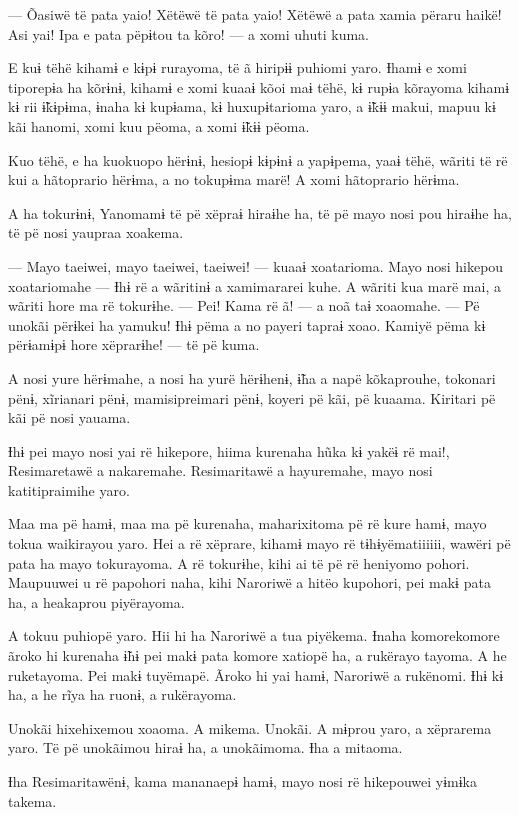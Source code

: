 --- Õasiwë të pata yaio! Xëtëwë të pata yaio! Xëtëwë a pata xamia përaru
haikë! Asi yai! Ipa e pata pëpɨtou ta kõro! --- a xomi uhuti kuma. 

E kuɨ tëhë kihamɨ e kɨpɨ rurayoma, të ã hiripɨɨ puhiomi yaro. Ɨhamɨ e
xomi tiporepɨa ha kõrɨnɨ, kihamɨ e xomi kuaaɨ kõoi maɨ tëhë, kɨ rupɨa
kõrayoma kihamɨ kɨ rii ɨ̃kɨpɨma, ɨnaha kɨ kupɨama, kɨ huxupɨtarioma yaro,
a ɨ̃kɨɨ makui, mapuu kɨ kãi hanomi, xomi kuu pëoma, a xomi ɨ̃kɨɨ pëoma. 

Kuo tëhë, e ha kuokuopo hërɨnɨ, hesiopɨ kɨpɨnɨ a yapɨpema, yaaɨ tëhë,
wãriti të rë kui a hãtoprario hërɨma, a no tokupɨma marë! A xomi
hãtoprario hërɨma. 

A ha tokurɨnɨ, Yanomamɨ të pë xëpraɨ hiraɨhe ha, të pë mayo nosi pou
hiraɨhe ha, të pë nosi yaupraa xoakema. 

--- Mayo taeiwei, mayo taeiwei, taeiwei! --- kuaaɨ xoatarioma. Mayo nosi
hikepou xoatariomahe --- Ɨhɨ rë a wãritinɨ a xamimararei kuhe. A wãriti
kua marë mai, a wãriti hore ma rë tokurɨhe. --- Pei! Kama rë ã! --- a
noã taɨ xoaomahe. --- Pë unokãi përɨkei ha yamuku! Ɨhɨ pëma a no payeri
tapraɨ xoao. Kamiyë pëma kɨ përɨamɨpɨ hore xëprarɨhe! --- të pë kuma. 

A nosi yure hërɨmahe, a nosi ha yurë hërɨhenɨ, ɨ̃ha a napë kõkaprouhe,
tokonari pënɨ, xĩrianari pënɨ, mamisipreimari pënɨ, koyeri pë kãi, pë
kuaama. Kiritari pë kãi pë nosi yauama. 

Ɨhɨ pei mayo nosi yai rë hikepore, hiima kurenaha hũka kɨ yakëɨ rë mai!,
Resimaretawë a nakaremahe. Resimaritawë a hayuremahe, mayo nosi
katitipraimihe yaro. 

Maa ma pë hamɨ, maa ma pë kurenaha, maharixitoma pë rë kure hamɨ, mayo
tokua waikirayou yaro. Hei a rë xëprare, kihamɨ mayo rë tɨhɨyëmatiiiiii,
wawëri pë pata ha mayo tokurayoma. A rë tokurɨhe, kihi ai të pë rë
heniyomo pohori. Maupuuwei u rë papohori naha, kihi Naroriwë a hitëo
kupohori, pei makɨ pata ha, a heakaprou piyërayoma. 

A tokuu puhiopë yaro. Hii hi ha Naroriwë a tua piyëkema. Ɨnaha
komorekomore ãroko hi kurenaha ɨ̃hɨ pei makɨ pata komore xatiopë ha, a
rukërayo tayoma. A he ruketayoma. Pei makɨ tuyëmapë. Ãroko hi yai hamɨ,
Naroriwë a rukënomi. Ɨhɨ kɨ ha, a he rĩya ha ruonɨ, a rukërayoma. 

Unokãi hixehixemou xoaoma. A mikema. Unokãi. A mɨprou yaro, a xëprarema
yaro. Të pë unokãimou hiraɨ ha, a unokãimoma. Ɨha a mitaoma. 

Ɨha Resimaritawënɨ, kama mananaepɨ hamɨ, mayo nosi rë hikepouwei yɨmɨka
takema. 

